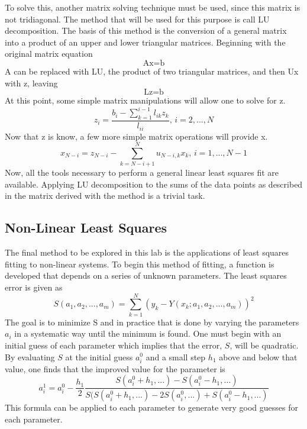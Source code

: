 \documentclass[12pt]{article}
\begin{document}
To solve this, another matrix solving technique must be used, since this matrix is not tridiagonal.  The method that will be used for this purpose is call LU decomposition.  The basis of this method is the conversion of a general matrix into a product of an upper and lower triangular matrices.  Beginning with the original matrix equation
\begin{equation}
\label{Axb}
\text{Ax}=\text{b}
\end{equation}
A can be replaced with LU, the product of two triangular matrices, and then Ux with z, leaving
\begin{equation}
\label{Lzb}
\text{Lz}=\text{b}
\end{equation}
At this point, some simple matrix manipulations will allow one to solve for z.
\begin{equation}
\label{z}
z_i=\frac{b_i-\sum_{k=1}^{i-1} l_{ik}z_k}{l_{ii}} \text{,          }i=2,...,N
\end{equation}
Now that z is know, a few more simple matrix operations will provide x. 
\begin{equation}
\label{x}
x_{N-i}=z_{N-i} - \sum_{k=N-i+1}^N u_{N-i,k} x_k \text{,    }i=1,...,N-1
\end{equation}
Now, all the tools necessary to perform a general linear least squares fit are available.  Applying LU decomposition to the sums of the data points as described in the matrix derived with the method is a trivial task.
\subsection{Non-Linear Least Squares}
The final method to be explored in this lab is the applications of least squares fitting to non-linear systems.  To begin this method of fitting, a function is developed that depends on a series of unknown parameters.  The least squares error is given as
\begin{equation}
\label{nonlinerror}
S(a_1,a_2,...,a_m)=\sum_{k=1}^N (y_k- Y(x_k;a_1,a_2,...,a_m))^2
\end{equation}
The goal is to minimize S and in practice that is done by varying the parameters $a_i$ in a systematic way until the minimum is found.  One must begin with an initial guess of each parameter which implies that the error, $S$, will be quadratic.  By evaluating $S$ at the initial guess $a_i^0$ and a small step $h_1$ above and below that value, one finds that the improved value for the parameter is
\begin{equation}
\label{parameter}
a_i^1=a_i^0 - \frac{h_1}{2} \frac{S(a_i^0+h_1,...)-S(a_i^0-h_1,...)}{S(S(a_i^0+h_1,...)-2S(a_i^0,...)+S(a_i^0-h_1,...)}
\end{equation}
This formula can be applied to each parameter to generate very good guesses for each parameter.
\end{document}
